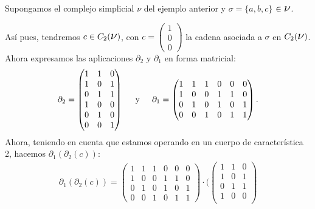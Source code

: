 \documentclass[12pt, a4paper, twoside]{book}
\numberwithin{equation}{section}
\theoremstyle{definition}
\newenvironment{ejem}
  {\pushQED{\qed}\renewcommand{\qedsymbol}{$\blacktriangleleft$}\ejemplo}
  {\popQED\endejemplo}
\theoremstyle{remark}
\theoremstyle{plain}
\begin{document}
	\begin{ejem}
		Supongamos el complejo simplicial {\Large $\nu$} del ejemplo 
		anterior y $\sigma = \{a,b,c\}$ $\in \text{{\Large $\nu$}}$.

		Así pues, tendremos $c \in C_{2}(\text{{\Large $\nu$}})$, con
		$c=\begin{pmatrix}
			1 \\
			0 \\
			0 
		\end{pmatrix}$ la cadena asociada a $\sigma$ en $C_{2}(
		\text{{\Large $\nu$}})$. Ahora expresamos las aplicaciones 
		$\partial_{2}$ y $\partial_{1}$ en forma matricial:
		\begin{equation*}
			\partial_{2}= \begin{pmatrix}
				1 & 1 & 0 \\
				1 & 0 & 1 \\
				0 & 1 & 1 \\
				1 & 0 & 0 \\
				0 & 1 & 0 \\
				0 & 0 & 1
			\end{pmatrix}
			\hspace{0.5cm}\text{y}\hspace{0.5cm}
			\partial_{1}= \begin{pmatrix}
				1 & 1 & 1 & 0 & 0 &0 \\
				1 & 0 & 0 & 1 & 1 &0 \\
				0 & 1 & 0 & 1 & 0 &1 \\
				0 & 0 & 1 & 0 & 1 &1
			\end{pmatrix}.
		\end{equation*}
		Ahora, teniendo en cuenta que estamos operando en un cuerpo de 
		característica 2, hacemos $\partial_{1}(\partial_{2}(c))$:
		\begin{equation*}
			\begin{split}
				\partial_{1}(\partial_{2}(c))=\begin{pmatrix}
				1 & 1 & 1 & 0 & 0 &0 \\
				1 & 0 & 0 & 1 & 1 &0 \\
				0 & 1 & 0 & 1 & 0 &1 \\
				0 & 0 & 1 & 0 & 1 &1
			\end{pmatrix}\cdot \Bigg( 
				\begin{pmatrix}
				1 & 1 & 0 \\
				1 & 0 & 1 \\
				0 & 1 & 1 \\
				1 & 0 & 0 \\

\end{pmatrix}
\end{split}
\end{equation*}
\end{ejem}
\end{document}
